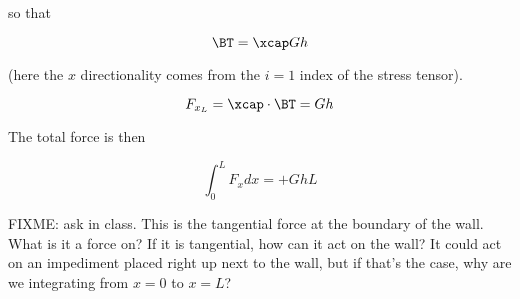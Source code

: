 so that

\begin{equation}\label{eqn:continuumL11:n}
\BT = \xcap G h
\end{equation}

(here the $x$ directionality comes from the $i = 1$ index of the stress tensor).

\begin{equation}\label{eqn:continuumL11:790}
F_{x_L} = \xcap \cdot \BT = G h
\end{equation}

The total force is then

\begin{equation}\label{eqn:continuumL11:810}
\int_0^L F_x dx = + G h L
\end{equation}

FIXME: ask in class.  This is the tangential force at the boundary of the wall.  What is it a force on?  If it is tangential, how can it act on the wall?  It could act on an impediment placed right up next to the wall, but if that's the case, why are we integrating from $x = 0$ to $x = L$?

\EndNoBibArticle
